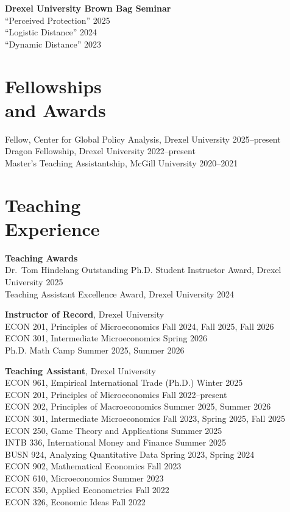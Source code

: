 \documentclass[margin,line]{res}
\newcommand{\entrygap}{\vspace{.09in}}
\begin{document}
\begin{resume}
\entrygap
{\bf Drexel University Brown Bag Seminar}\\
``Perceived Protection'' \hfill 2025\\
``Logistic Distance'' \hfill 2024\\
``Dynamic Distance'' \hfill 2023

\section{\sc Fellowships\\ and Awards}
Fellow, Center for Global Policy Analysis, Drexel University \hfill 2025--present\\
Dragon Fellowship, Drexel University \hfill 2022--present\\
Master's Teaching Assistantship, McGill University \hfill 2020--2021

\section{\sc Teaching\\ Experience}
{\bf Teaching Awards}\\
Dr.\ Tom Hindelang Outstanding Ph.D. Student Instructor Award, Drexel University \hfill 2025\\
Teaching Assistant Excellence Award, Drexel University \hfill 2024

\entrygap
{\bf Instructor of Record}, Drexel University\\
ECON 201, Principles of Microeconomics \hfill Fall 2024, Fall 2025, Fall 2026\\
ECON 301, Intermediate Microeconomics \hfill Spring 2026\\
Ph.D. Math Camp \hfill Summer 2025, Summer 2026

\entrygap
{\bf Teaching Assistant}, Drexel University\\
ECON 961, Empirical International Trade (Ph.D.) \hfill Winter 2025\\
ECON 201, Principles of Microeconomics \hfill Fall 2022--present\\
ECON 202, Principles of Macroeconomics \hfill Summer 2025, Summer 2026\\
ECON 301, Intermediate Microeconomics \hfill Fall 2023, Spring 2025, Fall 2025\\
ECON 250, Game Theory and Applications \hfill Summer 2025\\
INTB 336, International Money and Finance \hfill Summer 2025\\
BUSN 924, Analyzing Quantitative Data \hfill Spring 2023, Spring 2024\\
ECON 902, Mathematical Economics \hfill Fall 2023\\
ECON 610, Microeconomics \hfill Summer 2023\\
ECON 350, Applied Econometrics \hfill Fall 2022\\
ECON 326, Economic Ideas \hfill Fall 2022


\end{resume}
\end{document}
